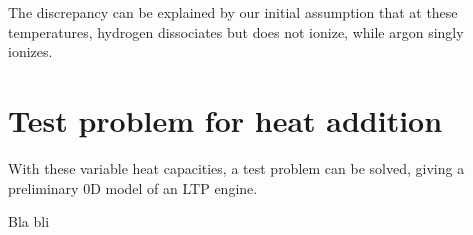         The discrepancy can be explained by our initial assumption that at these temperatures, hydrogen dissociates but does not ionize, while argon singly ionizes.

    \section{Test problem for heat addition}

        With these variable heat capacities, a test problem can be solved, giving a preliminary 0D model of an LTP engine.

        Bla bli
